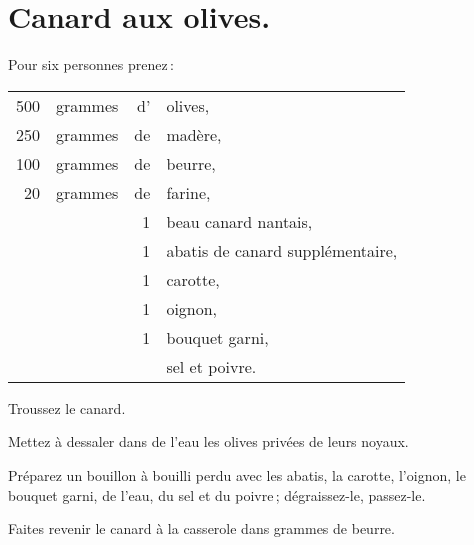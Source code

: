\section*{\centering Canard aux olives.}
{}

Pour six personnes prenez :

\medskip

\footnotesize
\begin{longtable}{rrrp{16em}}
    500 & grammes & d’ & olives,                                                                          \\
    250 & grammes & de & madère,                                                                          \\
    100 & grammes & de & beurre,                                                                          \\
     20 & grammes & de & farine,                                                                          \\
        &         &  1 & beau canard nantais,                                                             \\
        &         &  1 & abatis de canard supplémentaire,                                                 \\
        &         &  1 & carotte,                                                                         \\
        &         &  1 & oignon,                                                                          \\
        &         &  1 & bouquet garni,                                                                   \\
        &         &    & sel et poivre.                                                                   \\
\end{longtable}
\normalsize

Troussez le canard.

Mettez à dessaler dans de l'eau les olives privées de leurs noyaux.

Préparez un bouillon à bouilli perdu avec les abatis, la carotte, l'oignon, le
bouquet garni, de l'eau, du sel et du poivre ; dégraissez-le, passez-le.

Faites revenir le canard à la casserole dans {\mmm} grammes de beurre.

